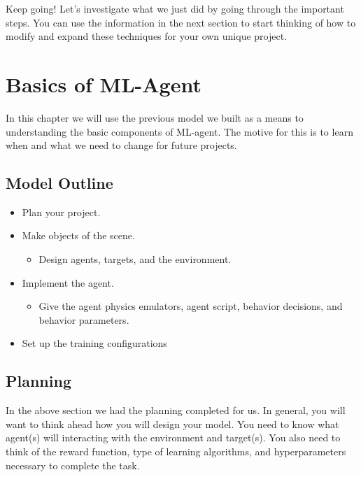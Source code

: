 \documentclass[11pt,fleqn,openany]{book} %
\begin{document}
\vspace{3cm}


\noindent{}

\begin{remark}
 Keep going! Let's investigate what we just did by going through the important steps. You can use the information in the next section to start thinking of how to modify and expand these techniques for your own unique project.
\end{remark}




\chapter{Basics of ML-Agent}
In this chapter we will use the previous model we built as a means to understanding the basic components of ML-agent. The motive for this is to learn when and what we need to change for future projects.

\section{Model Outline}
\begin{itemize}
    \item Plan your project.
    \item Make objects of the scene.
    \begin{itemize}
        \item Design agents, targets, and the environment.
    \end{itemize}
    \item Implement the agent.
    \begin{itemize}
        \item Give the agent physics emulators, agent script, behavior decisions, and behavior parameters.
    \end{itemize}
    \item Set up the training configurations
\end{itemize}

\section{Planning}
In the above section we had the planning completed for us. In general, you will want to think ahead how you will design your model. You need to know what agent(s) will interacting with the environment and target(s). You also need to think of the reward function, type of learning algorithms, and hyperparameters necessary to complete the task.\\
\end{document}
